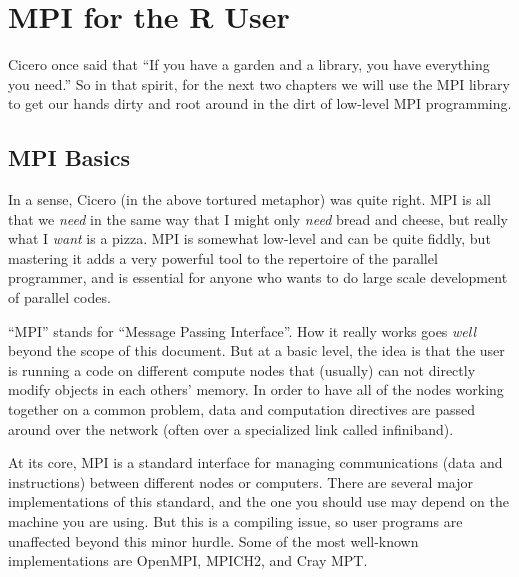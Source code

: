 


\chapter{MPI for the R User}
\label{chp:mpi_for_the_r_user}

\vspace{0.5cm}


Cicero once said that ``If you have a garden and a library, you have
everything you need.'' So in that spirit, for the next two chapters we will
use the MPI library to get our hands dirty and root around in the dirt of
low-level MPI programming.

\section{MPI Basics}

In a sense, Cicero (in the above tortured metaphor) was quite right. MPI is
all that we \emph{need} in the same way that I might only \emph{need} bread
and cheese, but really what I \emph{want} is a pizza. MPI is somewhat
low-level and can be quite fiddly, but mastering it adds a very powerful
tool to the repertoire of the parallel  programmer, and is
essential for anyone who wants to do large scale development of parallel
codes.  

``MPI'' stands for ``Message Passing Interface''. How it really works goes \emph{well} beyond the scope of 
this document. But at a basic level, the idea is that the user is running a 
code on different compute nodes that (usually) can not directly modify objects 
in each others' memory.  In order to have all of the nodes working together on 
a common problem, data and computation directives are passed around over the 
network (often over a specialized link called infiniband).  

At its core, MPI is a standard interface for managing communications
(data and instructions) between different nodes or computers.
There are several major implementations of this standard, and the one
you should use may depend on the machine you are using.
But this is a compiling issue, so user programs are unaffected beyond
this minor hurdle. Some of the most well-known implementations are
OpenMPI, MPICH2, and
Cray MPT.


